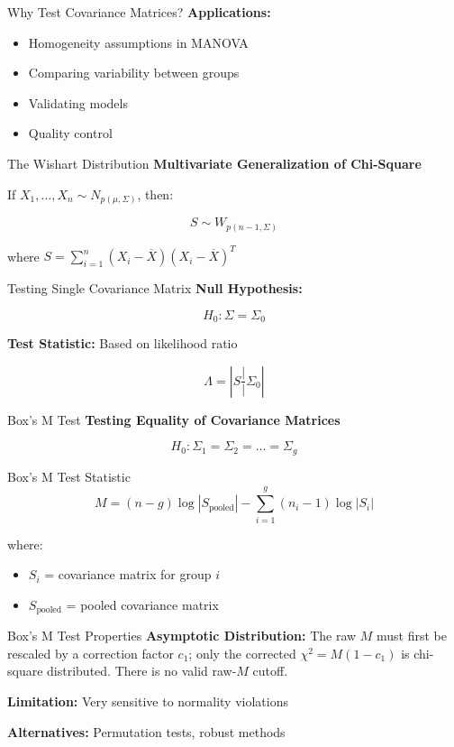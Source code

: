 \documentclass[aspectratio=169,ignorenonframetext]{beamer}
\begin{document}
\begin{frame}{Why Test Covariance Matrices?}
\textbf{Applications:}

\begin{itemize}
\item
  Homogeneity assumptions in MANOVA
\item
  Comparing variability between groups
\item
  Validating models
\item
  Quality control
\end{itemize}
\end{frame}

\begin{frame}{The Wishart Distribution}
\textbf{Multivariate Generalization of Chi-Square}

If \(X_{1},\ldots,X_{n} \sim N_{p(\mu,\Sigma)}\), then:

\[S \sim W_{p(n - 1,\Sigma)}\]

where
\(S = \sum_{i = 1}^{n}\left( X_{i} - \overline{X} \right)\left( X_{i} - \overline{X} \right)^{T}\)
\end{frame}

\begin{frame}{Testing Single Covariance Matrix}
\textbf{Null Hypothesis:}

\[H_{0}:\Sigma = \Sigma_{0}\]

\textbf{Test Statistic:} Based on likelihood ratio

\[\Lambda = |S\frac{|}{|}\Sigma_{0}|\]
\end{frame}

\begin{frame}{Box's M Test}
\textbf{Testing Equality of Covariance Matrices}

\[H_{0}:\Sigma_{1} = \Sigma_{2} = \ldots = \Sigma_{g}\]
\end{frame}

\begin{frame}{Box's M Test Statistic}
\[M = (n - g)\log|S_{\text{pooled}}| - \sum_{i = 1}^{g}\left( n_{i} - 1 \right)\log|S_{i}|\]

where:

\begin{itemize}
\item
  \(S_{i}\) = covariance matrix for group \(i\)
\item
  \(S_{\text{pooled}}\) = pooled covariance matrix
\end{itemize}
\end{frame}

\begin{frame}{Box's M Test Properties}
\textbf{Asymptotic Distribution:} The raw \(M\) must first be rescaled
by a correction factor \(c_{1}\); only the corrected
\(\chi^{2} = M\left( 1 - c_{1} \right)\) is chi-square distributed.
There is no valid raw-\(M\) cutoff.

\textbf{Limitation:} Very sensitive to normality violations

\textbf{Alternatives:} Permutation tests, robust methods
\end{frame}
\end{document}
